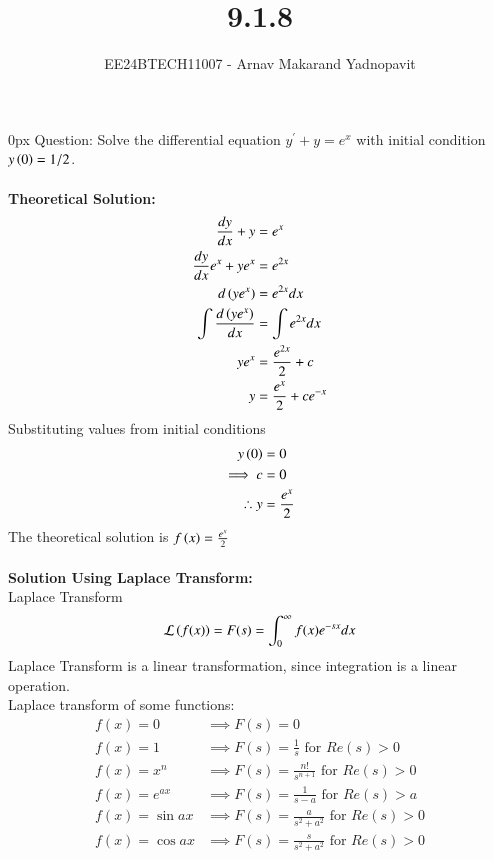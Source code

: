 \documentclass[journal,12pt,onecolumn]{IEEEtran}
\theoremstyle{remark}
\begin{document}
\title{9.1.8}
\author{EE24BTECH11007 - Arnav Makarand Yadnopavit}
\maketitle
\renewcommand{\thefigure}{\theenumi}
\renewcommand{\thetable}{\theenumi}
\parindent 0px Question: Solve the differential equation $y^\prime+y=e^x$ with initial condition $y\left(0\right)=1/2$. \\
\solution\\
\textbf{Theoretical Solution:}\\
\begin{align}
    \frac{dy}{dx}+y&=e^x \label{eq:first}\\
    \frac{dy}{dx} e^x+ye^x&=e^{2x}\\
    d\left(ye^x\right)&=e^{2x}dx\\
    \int \frac{d\left(ye^x\right)}{dx}&=\int e^{2x}dx\\
    ye^x&=\frac{e^{2x}}{2}+c\\
    y&=\frac{e^x}{2}+ce^{-x}
\end{align}
Substituting values from initial conditions
\begin{align}
    y\left(0\right)&=0\\
    \implies c&=0\\
    \therefore y&=\frac{e^x}{2}
\end{align}
The theoretical solution is $f\left(x\right)=\frac{e^x}{2}$\\\\
\textbf{Solution Using Laplace Transform:}\\
Laplace Transform \\
\begin{align}
	\mathcal{L} \left(f(x)\right) = F(s) = \int_{0}^{\infty} f(x) e^{-sx} dx \label{eq:lap} 
\end{align}
Laplace Transform is a linear transformation, since integration is a linear operation.\\
Laplace transform of some functions: 
	\begin{align}
	f(x) = 0 &\implies F(s) = 0 \\
	f(x) = 1 &\implies F(s) = \frac{1}{s} \text{ for } Re(s) > 0\\
	f(x) = x^n &\implies F(s) = \frac{n!}{s^{n+1}} \text{ for } Re(s) > 0 \\
	f(x) = e^{ax} &\implies F(s) = \frac{1}{s-a} \text{ for } Re(s) > a \label{eq:exp}\\
	f(x) = \sin{ax} &\implies F(s) = \frac{a}{s^2 + a^2} \text{ for } Re(s) > 0 \\
	f(x) = \cos{ax} &\implies F(s) = \frac{s}{s^2 + a^2} \text{ for } Re(s) > 0
\end{align}
\end{document}
